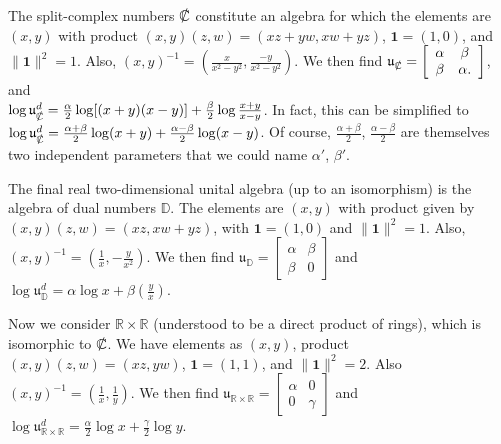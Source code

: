 \documentclass{amsart}
\numberwithin{equation}{section}
\theoremstyle{definition}
\numberwithin{theorem}{section}
\begin{document}
The split-complex numbers $\slashed{\mathbb{C}}$ constitute an algebra for which the elements are  $(x,y)$ with product $(x,y)(z,w) = (xz+yw,xw+yz)$, $ \mathbf{1} = (1,0)$, and $\|\mathbf{1}\|^2 = 1$.  Also, $(x,y)^{-1} = (\frac{x}{x^2-y^2},\frac{-y}{x^2-y^2})$. \hspace{1cm}  We then find $\mathfrak{u}_{\slashed{\mathbb{C}}} = \left[\begin{array}{ccc}
 \alpha & \beta   \\ 
 \beta & \alpha.    
\end{array}\right]$, \hspace{.5cm} and \hfill \\ $\log  \mathfrak{u}^d_{\slashed{\mathbb{C}}} = \frac{\alpha}{2}\log[(x+
y)(x-y)] +  \frac{\beta}{2}\log \frac{x+y}{x-y}$.  In fact, this can be simplified to $\log  \mathfrak{u}^d_{\slashed{\mathbb{C}}} = \frac{\alpha+\beta}{2}\log(x+y) + \frac{\alpha-\beta}{2}\log(x-y)$.  Of course, $\frac{\alpha+\beta}{2}$, $\frac{\alpha-\beta}{2}$ are themselves two independent parameters that we could name $\alpha'$, $\beta'$.

The final real two-dimensional unital algebra (up to an isomorphism) is the algebra of dual numbers $\mathbb{D}$.  The elements are $(x,y)$ with product given by $(x,y)(z,w) = (xz,xw+yz)$, with $\mathbf{1}=(1,0)$ and $\|\mathbf{1}\|^2 = 1$. Also, $(x,y)^{-1} = (\frac{1}{x},-\frac{y}{x^2})$.  We then find $\mathfrak{u}_\mathbb{D} = \left[\begin{array}{ccc}
 \alpha & \beta   \\ 
 \beta & 0    
\end{array}\right]$ and $\log  \mathfrak{u}^d_{\mathbb{D}} = \alpha\log x + \beta\left(\frac{y}{x}\right)$. 

   
   Now we consider $\mathbb{R}\times\mathbb{R}$ (understood to be a direct product of rings), which is isomorphic to $\slashed{\mathbb{C}}$.  We have elements as $(x,y)$, product $(x,y)(z,w) = (xz,yw)$, $\mathbf{1}=(1,1)$, and $\|\mathbf{1}\|^2 = 2$.  Also $(x,y)^{-1} = (\frac{1}{x},\frac{1}{y})$.  We then find $\mathfrak{u}_{\mathbb{R}\times\mathbb{R}} = \left[\begin{array}{ccc}
 \alpha & 0   \\ 
 0 & \gamma    
\end{array}\right]$ and $\log  \mathfrak{u}^d_{\mathbb{R}\times\mathbb{R}} = \frac{\alpha}{2}\log x + \frac{\gamma}{2}\log y$. 
\end{document}
